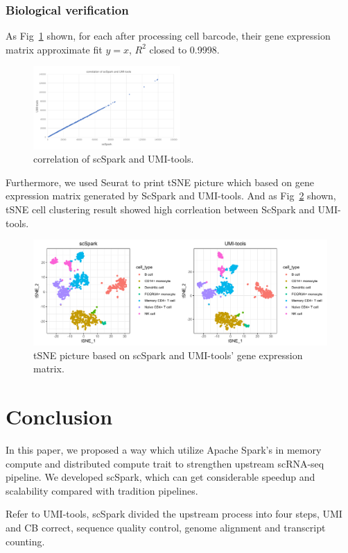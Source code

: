 \documentclass[conference]{IEEEtran}
\begin{document}
\subsubsection{Biological verification} 
As Fig~\ref{fig9} shown, for each after processing cell barcode, their gene expression matrix approximate fit $y=x$, $R^{2}$ closed to 0.9998. 
\begin{figure}
  \includegraphics[width=0.5\textwidth]{fig9.pdf}
  \caption{correlation of scSpark and UMI-tools.} \label{fig9}
\end{figure}
Furthermore, we used Seurat to print tSNE picture which based on gene expression matrix generated by ScSpark and UMI-tools. 
And as Fig~\ref{fig10} shown, tSNE cell clustering result showed high corrleation between ScSpark and UMI-tools. 
\begin{figure}
  \includegraphics[width=\textwidth]{fig10.pdf}
  \caption{tSNE picture based on scSpark and UMI-tools' gene expression matrix.} \label{fig10}
\end{figure}

\section{Conclusion}
In this paper, we proposed a way which utilize Apache Spark's in memory compute and distributed compute trait to strengthen upstream scRNA-seq pipeline.
We developed scSpark, which can get considerable speedup and scalability compared with tradition pipelines.

Refer to UMI-tools, scSpark divided the upstream process into four steps, UMI and CB correct, sequence quality control, genome alignment and transcript counting. 


\end{document}
